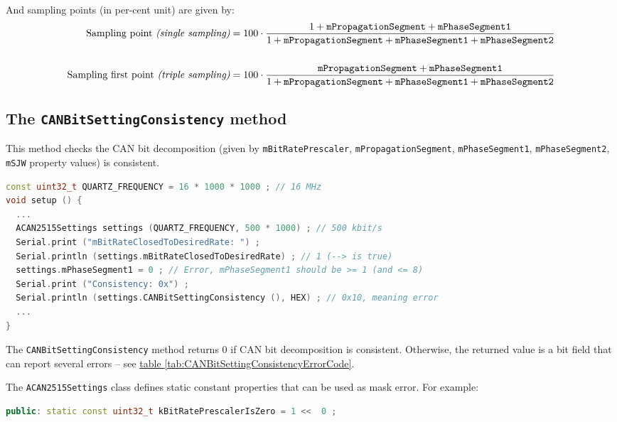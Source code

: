 \documentclass[10pt, a4paper, obeyspaces, openany]{extarticle}
\newcommand \subsectionLabel[2]{\subsection{#1}\label{subsec:#2}}
\newcommand\refTableau[1]{\hyperref[tab:#1]{table \ref*{tab:#1}}}
\begin{document}
And sampling points (in per-cent unit) are given by:
{\small
\begin{align*}
\text{Sampling point {\it(single sampling)}} & = 100 \cdot \frac{1 + \texttt{mPropagationSegment} + \texttt{mPhaseSegment1}}{1 + \texttt{mPropagationSegment} + \texttt{mPhaseSegment1} + \texttt{mPhaseSegment2}}  \\
  & \\
\text{Sampling first point {\it(triple sampling)}} & = 100 \cdot \frac{\texttt{mPropagationSegment} + \texttt{mPhaseSegment1}}{1 + \texttt{mPropagationSegment} + \texttt{mPhaseSegment1} + \texttt{mPhaseSegment2}}
\end{align*}
}












\subsectionLabel{The \texttt{CANBitSettingConsistency} method}{CANBitSettingConsistency}

This method checks the CAN bit decomposition (given by \texttt{mBitRatePrescaler}, \texttt{mPropagationSegment}, \texttt{mPhaseSegment1}, \texttt{mPhaseSegment2}, \texttt{mSJW} property values) is consistent.

{ \small\begin{lstlisting}[language=c++]
const uint32_t QUARTZ_FREQUENCY = 16 * 1000 * 1000 ; // 16 MHz
void setup () {
  ...
  ACAN2515Settings settings (QUARTZ_FREQUENCY, 500 * 1000) ; // 500 kbit/s
  Serial.print ("mBitRateClosedToDesiredRate: ") ;
  Serial.println (settings.mBitRateClosedToDesiredRate) ; // 1 (--> is true)
  settings.mPhaseSegment1 = 0 ; // Error, mPhaseSegment1 should be >= 1 (and <= 8)
  Serial.print ("Consistency: 0x") ;
  Serial.println (settings.CANBitSettingConsistency (), HEX) ; // 0x10, meaning error
  ...
}
\end{lstlisting}}

The \texttt{CANBitSettingConsistency} method returns $0$ if CAN bit decomposition is consistent. Otherwise, the returned value is a bit field that can report several errors -- see \refTableau{CANBitSettingConsistencyErrorCode}.


The \texttt{ACAN2515Settings} class defines static constant properties that can be used as mask error. For example:
{ \small\begin{lstlisting}[language=c++]
public: static const uint32_t kBitRatePrescalerIsZero = 1 <<  0 ;
\end{lstlisting}}
\end{document}
